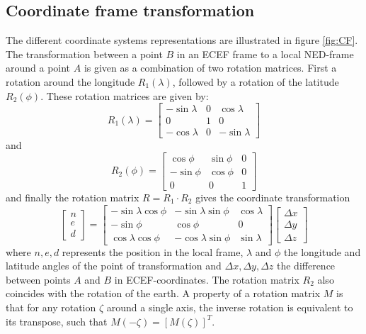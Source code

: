 \subsection{Coordinate frame transformation}
The different coordinate systems representations are illustrated in figure \ref{fig:CF}. The transformation between a point $B$ in an ECEF frame to a local NED-frame around a point $A$ is given as a combination of two rotation matrices. First a rotation around the longitude $R_1(\lambda)$, followed by a rotation of the latitude $R_2(\phi)$. These rotation matrices are given by:
\begin{equation}
R_1(\lambda)=\begin{bmatrix}
-\sin \lambda & 0 & \cos \lambda \\
0  & 1 & 0 \\
-\cos \lambda &0 & -\sin \lambda
\end{bmatrix}
\end{equation}
and
\begin{equation}\label{eq:rot_matrix}
R_2(\phi)=\begin{bmatrix}
\cos \phi & \sin \phi &0\\
-\sin \phi & \cos \phi & 0 \\
0 & 0 & 1
\end{bmatrix}
\end{equation}
and finally the rotation matrix $R=R_1\cdot R_2$ gives the coordinate transformation
\begin{equation}
\begin{bmatrix} n\\ e\\ d \end{bmatrix}=
\begin{bmatrix}
-\sin \lambda \cos \phi & -\sin \lambda \sin \phi & \cos \lambda \\
-\sin \phi &\cos \phi &0 \\
\cos \lambda \cos \phi & -\cos \lambda \sin \phi & \sin \lambda
\end{bmatrix}
\begin{bmatrix}
\Delta x \\ \Delta y \\ \Delta z
\end{bmatrix}
\end{equation}
where $n,e,d$ represents the position in the local frame, $\lambda$ and $\phi$ the longitude and latitude angles of the point of transformation and $\Delta x, \Delta y,\Delta z$ the difference between points $A$ and $B$ in ECEF-coordinates. The rotation matrix $R_2$ also coincides with the rotation of the earth. A property of a rotation matrix $M$ is that for any rotation $\zeta$ around a single axis, the inverse rotation is equivalent to its transpose, such that $M(-\zeta)=[M(\zeta)]^T$.

